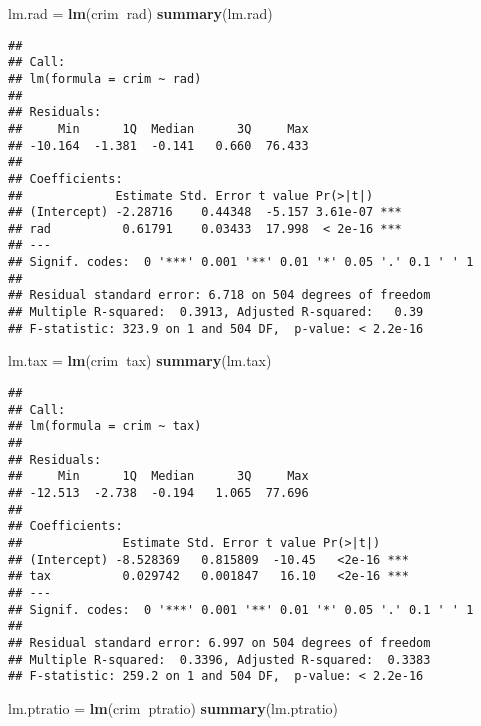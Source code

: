 \documentclass[]{article}
\newenvironment{Shaded}{\begin{snugshade}}{\end{snugshade}}
\newcommand{\KeywordTok}[1]{\textcolor[rgb]{0.13,0.29,0.53}{\textbf{#1}}}
\newcommand{\NormalTok}[1]{#1}
\newcommand{\OperatorTok}[1]{\textcolor[rgb]{0.81,0.36,0.00}{\textbf{#1}}}
\newcommand{\StringTok}[1]{\textcolor[rgb]{0.31,0.60,0.02}{#1}}
\begin{document}
\begin{Shaded}
\begin{Highlighting}[]
\NormalTok{lm.rad =}\StringTok{ }\KeywordTok{lm}\NormalTok{(crim}\OperatorTok{~}\NormalTok{rad)}
\KeywordTok{summary}\NormalTok{(lm.rad)}
\end{Highlighting}
\end{Shaded}

\begin{verbatim}
## 
## Call:
## lm(formula = crim ~ rad)
## 
## Residuals:
##     Min      1Q  Median      3Q     Max 
## -10.164  -1.381  -0.141   0.660  76.433 
## 
## Coefficients:
##             Estimate Std. Error t value Pr(>|t|)    
## (Intercept) -2.28716    0.44348  -5.157 3.61e-07 ***
## rad          0.61791    0.03433  17.998  < 2e-16 ***
## ---
## Signif. codes:  0 '***' 0.001 '**' 0.01 '*' 0.05 '.' 0.1 ' ' 1
## 
## Residual standard error: 6.718 on 504 degrees of freedom
## Multiple R-squared:  0.3913, Adjusted R-squared:   0.39 
## F-statistic: 323.9 on 1 and 504 DF,  p-value: < 2.2e-16
\end{verbatim}

\begin{Shaded}
\begin{Highlighting}[]
\NormalTok{lm.tax =}\StringTok{ }\KeywordTok{lm}\NormalTok{(crim}\OperatorTok{~}\NormalTok{tax)}
\KeywordTok{summary}\NormalTok{(lm.tax)}
\end{Highlighting}
\end{Shaded}

\begin{verbatim}
## 
## Call:
## lm(formula = crim ~ tax)
## 
## Residuals:
##     Min      1Q  Median      3Q     Max 
## -12.513  -2.738  -0.194   1.065  77.696 
## 
## Coefficients:
##              Estimate Std. Error t value Pr(>|t|)    
## (Intercept) -8.528369   0.815809  -10.45   <2e-16 ***
## tax          0.029742   0.001847   16.10   <2e-16 ***
## ---
## Signif. codes:  0 '***' 0.001 '**' 0.01 '*' 0.05 '.' 0.1 ' ' 1
## 
## Residual standard error: 6.997 on 504 degrees of freedom
## Multiple R-squared:  0.3396, Adjusted R-squared:  0.3383 
## F-statistic: 259.2 on 1 and 504 DF,  p-value: < 2.2e-16
\end{verbatim}

\begin{Shaded}
\begin{Highlighting}[]
\NormalTok{lm.ptratio =}\StringTok{ }\KeywordTok{lm}\NormalTok{(crim}\OperatorTok{~}\NormalTok{ptratio)}
\KeywordTok{summary}\NormalTok{(lm.ptratio)}
\end{Highlighting}
\end{Shaded}
\end{document}
